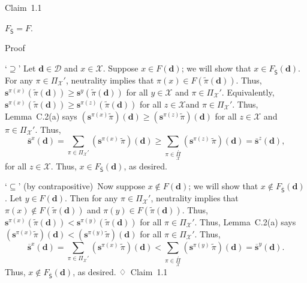 \documentclass[
]{article}
\begin{document}
Claim~1.1

\(F_{\overline{\mathsf{S}}} = F\).

Proof

`\(\supseteq\)' Let \(\mathbf{d} \in \mathcal{D}\) and
\(x \in \mathcal{X}\). Suppose \(x \in F\left( \mathbf{d} \right)\); we
will show that
\(x \in F_{\overline{\mathsf{S}}}\left( \mathbf{d} \right)\). For any
\(\pi \in \Pi_{\mathcal{X}}'\), neutrality implies that
\(\pi(x) \in F\left( \widetilde{\pi}\left( \mathbf{d} \right) \right)\).
Thus,
\(\mathbf{s}^{\pi{(x)}}\left( \widetilde{\pi}\left( \mathbf{d} \right) \right) \geq \mathbf{s}^{y}\left( \widetilde{\pi}\left( \mathbf{d} \right) \right)\)
for all \(y \in \mathcal{X}\) and \(\pi \in \Pi_{\mathcal{X}}'\).
Equivalently,
\(\mathbf{s}^{\pi{(x)}}\left( \widetilde{\pi}\left( \mathbf{d} \right) \right) \geq \mathbf{s}^{\pi{(z)}}\left( \widetilde{\pi}\left( \mathbf{d} \right) \right)\)
for all \(z \in \mathcal{X}\)and \(\pi \in \Pi_{\mathcal{X}}'\). Thus,
Lemma~C.2(a) says
\(\left( \mathbf{s}^{\pi{(x)}}\widetilde{\pi} \right)\left( \mathbf{d} \right) \geq \left( \mathbf{s}^{\pi{(z)}}\widetilde{\pi} \right)\left( \mathbf{d} \right)\)
for all \(z \in \mathcal{X}\) and \(\pi \in \Pi_{\mathcal{X}}'\). Thus,
\[{\overline{\mathbf{s}}}^{x}\left( \mathbf{d} \right) = \sum\limits_{\pi \in \Pi_{\mathcal{X}}'}\left( \mathbf{s}^{\pi{(x)}}\,\widetilde{\pi} \right)\left( \mathbf{d} \right) \geq \sum\limits_{\pi \in \underset{\mathcal{X}}{\overset{'}{\Pi}}}\left( \mathbf{s}^{\pi{(z)}}\,\widetilde{\pi} \right)\left( \mathbf{d} \right) = {\overline{\mathbf{s}}}^{z}\left( \mathbf{d} \right)\text{,}\]
for all \(z \in \mathcal{X}\). Thus,
\(x \in F_{\overline{\mathsf{S}}}\left( \mathbf{d} \right)\), as
desired.

`\(\subseteq\)' (by contrapositive)~Now suppose
\(x \notin F\left( \mathbf{d} \right)\); we will show that
\(x \notin F_{\overline{\mathsf{S}}}\left( \mathbf{d} \right)\). Let
\(y \in F\left( \mathbf{d} \right)\). Then for any
\(\pi \in \Pi_{\mathcal{X}}'\), neutrality implies that
\(\pi(x) \notin F\left( \widetilde{\pi}\left( \mathbf{d} \right) \right)\)
and
\(\pi(y) \in F\left( \widetilde{\pi}\left( \mathbf{d} \right) \right)\).
Thus,
\(\mathbf{s}^{\pi{(x)}}\left( \widetilde{\pi}\left( \mathbf{d} \right) \right) < \mathbf{s}^{\pi{(y)}}\left( \widetilde{\pi}\left( \mathbf{d} \right) \right)\)
for all \(\pi \in \Pi_{\mathcal{X}}'\). Thus, Lemma~C.2(a) says
\(\left( \mathbf{s}^{\pi{(x)}}\widetilde{\pi} \right)\left( \mathbf{d} \right) < \left( \mathbf{s}^{\pi{(y)}}\widetilde{\pi} \right)\left( \mathbf{d} \right)\)
for all \(\pi \in \Pi_{\mathcal{X}}'\). Thus,
\[{\overline{\mathbf{s}}}^{x}\left( \mathbf{d} \right) = \sum\limits_{\pi \in \Pi_{\mathcal{X}}'}\left( \mathbf{s}^{\pi{(x)}}\,\widetilde{\pi} \right)\left( \mathbf{d} \right) < \sum\limits_{\pi \in \underset{\mathcal{X}}{\overset{'}{\Pi}}}\left( \mathbf{s}^{\pi{(y)}}\,\widetilde{\pi} \right)\left( \mathbf{d} \right) = {\overline{\mathbf{s}}}^{y}\left( \mathbf{d} \right)\text{.}\]
Thus, \(x \notin F_{\overline{\mathsf{S}}}\left( \mathbf{d} \right)\),
as desired. ♢~Claim~1.1
\end{document}
